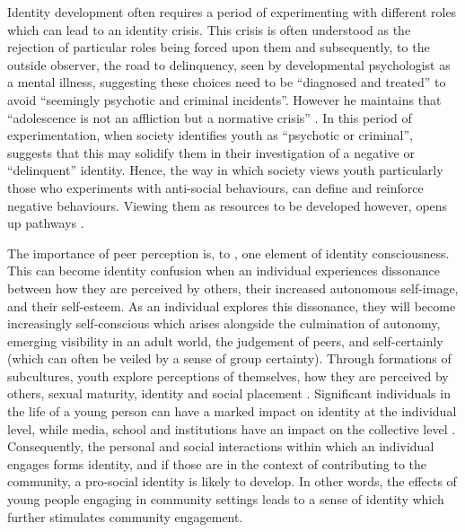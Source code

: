 \label{IdentityPsych}
Identity development often requires a period of experimenting with different roles which can lead to an identity crisis. This crisis is often understood as the rejection of particular roles being forced upon them and subsequently, to the outside observer, the road to delinquency, seen by developmental psychologist \citet[][p132]{Erikson1968} as a mental illness, suggesting these choices need to be “diagnosed and treated” to avoid “seemingly psychotic and criminal incidents”. However he maintains that “adolescence is not an affliction but a normative crisis” \citep[][p116]{Erikson1956}. In this period of experimentation, when society identifies youth as “psychotic or criminal”, \citet[][p255]{Erikson1968} suggests that this may solidify them in their investigation of a negative or “delinquent” identity. Hence, the way in which society views youth particularly those who experiments with anti-social behaviours, can define and reinforce negative behaviours. Viewing them as resources to be developed however, opens up pathways \citep{Roth1998}.

The importance of peer perception is, to \citet{Erikson1968}, one element of identity consciousness. This can become identity confusion when an individual experiences dissonance between how they are perceived by others, their increased autonomous self-image, and their self-esteem. As an individual explores this dissonance, they will become increasingly self-conscious which arises alongside the culmination of autonomy, emerging visibility in an adult world, the judgement of peers, and self-certainly (which can often be veiled by a sense of group certainty). Through formations of subcultures, youth explore perceptions of themselves, how they are perceived by others, sexual maturity, identity and social placement \citep[][]{Erikson1968}. Significant individuals in the life of a young person can have a marked impact on identity at the individual level, while media, school and institutions have an impact on the collective level \citep{Juhasz1982}. Consequently, the personal and social interactions within which an individual engages forms identity, and if those are in the context of contributing to the community, a pro-social identity is likely to develop. In other words, the effects of young people engaging in community settings leads to a sense of identity which further stimulates community engagement.

